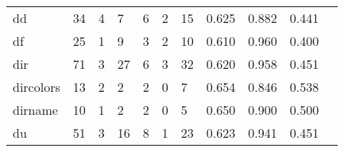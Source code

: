 \begin{longtable}{lp{1.2cm}p{1.2cm}p{1.2cm}p{1.2cm}p{1.2cm}p{1.2cm}p{1.2cm}p{1.2cm}p{1.2cm}p{1.2cm}}
dd        &                                    34 &                                                  4 &                                                  7 &                                                  6 &                                                  2 &                                                 15 &                                         0.625 &                                              0.882 &                                              0.441 \\
df        &                                    25 &                                                  1 &                                                  9 &                                                  3 &                                                  2 &                                                 10 &                                         0.610 &                                              0.960 &                                              0.400 \\
dir       &                                    71 &                                                  3 &                                                 27 &                                                  6 &                                                  3 &                                                 32 &                                         0.620 &                                              0.958 &                                              0.451 \\
dircolors &                                    13 &                                                  2 &                                                  2 &                                                  2 &                                                  0 &                                                  7 &                                         0.654 &                                              0.846 &                                              0.538 \\
dirname   &                                    10 &                                                  1 &                                                  2 &                                                  2 &                                                  0 &                                                  5 &                                         0.650 &                                              0.900 &                                              0.500 \\
du        &                                    51 &                                                  3 &                                                 16 &                                                  8 &                                                  1 &                                                 23 &                                         0.623 &                                              0.941 &                                              0.451 \\

\end{longtable}
